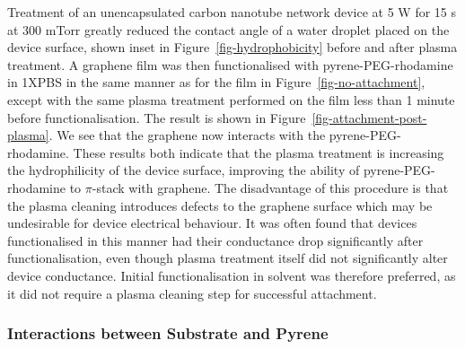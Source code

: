 \documentclass[
  a4paper,
]{scrbook}
\begin{document}
Treatment of an unencapsulated carbon nanotube network device at 5 W for
15 s at 300 mTorr greatly reduced the contact angle of a water droplet
placed on the device surface, shown inset in
Figure~\ref{fig-hydrophobicity} before and after plasma treatment. A
graphene film was then functionalised with pyrene-PEG-rhodamine in 1XPBS
in the same manner as for the film in Figure~\ref{fig-no-attachment},
except with the same plasma treatment performed on the film less than 1
minute before functionalisation. The result is shown in
Figure~\ref{fig-attachment-post-plasma}. We see that the graphene now
interacts with the pyrene-PEG-rhodamine. These results both indicate
that the plasma treatment is increasing the hydrophilicity of the device
surface, improving the ability of pyrene-PEG-rhodamine to \(\pi\)-stack
with graphene. The disadvantage of this procedure is that the plasma
cleaning introduces defects to the graphene surface which may be
undesirable for device electrical behaviour. It was often found that
devices functionalised in this manner had their conductance drop
significantly after functionalisation, even though plasma treatment
itself did not significantly alter device conductance. Initial
functionalisation in solvent was therefore preferred, as it did not
require a plasma cleaning step for successful attachment.

\hypertarget{interactions-between-substrate-and-pyrene}{%
\subsubsection*{Interactions between Substrate and
Pyrene}\label{interactions-between-substrate-and-pyrene}}
\end{document}
